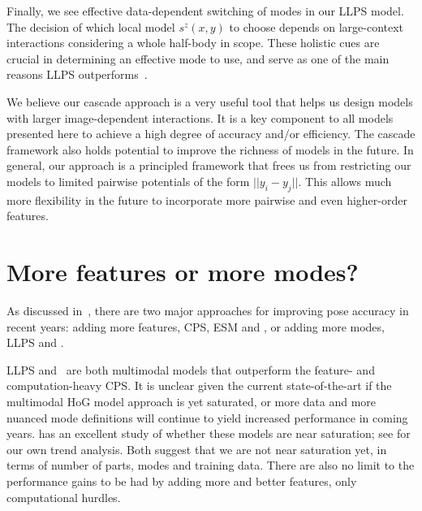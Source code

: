 Finally, we see effective data-dependent switching of modes in our LLPS model.  
The decision of which local model $s^z(x,y)$ to choose depends on large-context 
interactions considering a whole half-body in scope. These holistic cues are 
crucial in determining an effective mode to use, and serve as one of the main 
reasons LLPS outperforms~\citet{deva2011}.

We believe our cascade approach is a very useful tool that helps us design 
models with larger image-dependent interactions.  It is a key component to all 
models presented here to achieve a high degree of accuracy and/or efficiency.  
The cascade framework also holds potential to improve the richness of models in 
the future.  In general, our approach is a principled framework that frees us 
from restricting our models to limited pairwise potentials of the form $||y_i - 
y_j||$.  This allows much more flexibility in the future to incorporate more 
pairwise and even higher-order features. 

\section{More features or more modes?}
As discussed in~, there are two major approaches for improving 
pose accuracy in recent years: adding more features, \eg CPS, ESM and 
\citet{ferrari08,eichner09,ddtran}, or adding more modes, \eg LLPS and 
\citet{dpm,wang2011,deva2011,everingham2011}.  

LLPS and~\citet{deva2011} are both multimodal models that outperform the 
feature- and computation-heavy CPS.  It is unclear given the current 
state-of-the-art if the multimodal HoG model approach is yet saturated, or more 
data and more nuanced mode definitions will continue to yield increased 
performance in coming years.  \citet{zhuwe} has an excellent study of whether 
these models are near saturation; see  for our own 
trend analysis.  Both suggest that we are not near saturation yet, in terms of 
number of parts, modes and training data. There are also no limit to the 
performance gains to be had by adding more and better features, only 
computational hurdles.

